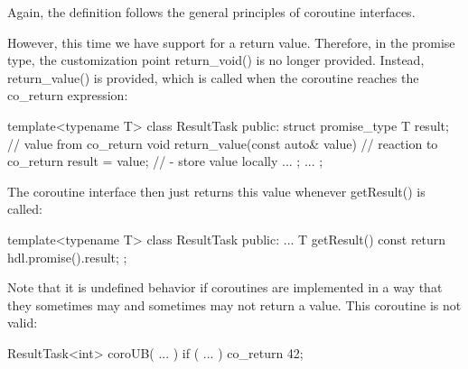 Again, the definition follows the general principles of coroutine interfaces.

However, this time we have support for a return value. Therefore, in the promise type, the customization point return\_void() is no longer provided. Instead, return\_value() is provided, which is called when the coroutine reaches the co\_return expression:

\begin{cpp}
template<typename T>
class ResultTask {
	public:
	struct promise_type {
		T result{}; // value from co_return
		void return_value(const auto& value) { // reaction to co_return
			result = value; // - store value locally
		}
		...
	};
	...
};
\end{cpp}

The coroutine interface then just returns this value whenever getResult() is called:

\begin{cpp}
template<typename T>
class ResultTask {
	public:
	...
	T getResult() const {
		return hdl.promise().result;
	}
};
\end{cpp}


Note that it is undefined behavior if coroutines are implemented in a way that they sometimes may and sometimes may not return a value. This coroutine is not valid:

\begin{cpp}
ResultTask<int> coroUB( ... )
{
	if ( ... ) {
		co_return 42;
	}
}
\end{cpp}












